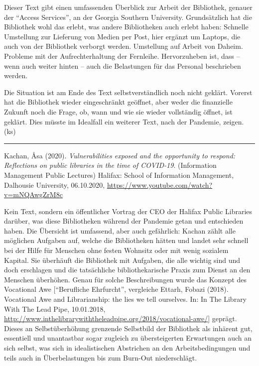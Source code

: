 \documentclass[a4paper,
fontsize=11pt,
oneside,
numbers=noperiodatend,
parskip=half-,
bibliography=totoc,
final
]{scrartcl}
\begin{document}
Dieser Text gibt einen umfassenden Überblick zur Arbeit der Bibliothek,
genauer der \enquote{Access Services}, an der Georgia Southern
University. Grundsätzlich hat die Bibliothek wohl das erlebt, was andere
Bibliotheken auch erlebt haben: Schnelle Umstellung zur Lieferung von
Medien per Post, hier ergänzt um Laptops, die auch von der Bibliothek
verborgt werden. Umstellung auf Arbeit von Daheim. Probleme mit der
Aufrechterhaltung der Fernleihe. Hervorzuheben ist, dass -- wenn auch
weiter hinten -- auch die Belastungen für das Personal beschrieben
werden.

Die Situation ist am Ende des Text selbstverständlich noch nicht
geklärt. Vorerst hat die Bibliothek wieder eingeschränkt geöffnet, aber
weder die finanzielle Zukunft noch die Frage, ob, wann und wie sie
wieder vollständig öffnet, ist geklärt. Dies müsste im Idealfall ein
weiterer Text, nach der Pandemie, zeigen. (ks)

\begin{center}\rule{0.5\linewidth}{0.5pt}\end{center}

Kachan, Åsa (2020). \emph{Vulnerabilities exposed and the opportunity to
respond: Reflections on public libraries in the time of COVID-19}.
(Information Management Public Lectures) Halifax: School of Information
Management, Dalhousie University, 06.10.2020,
\url{https://www.youtube.com/watch?v=mNQAwgZrM8c}

Kein Text, sondern ein öffentlicher Vortrag der CEO der Halifax Public
Libraries darüber, was diese Bibliotheken während der Pandemie getan und
entschieden haben. Die Übersicht ist umfassend, aber auch gefährlich:
Kachan zählt alle möglichen Aufgaben auf, welche die Bibliotheken hätten
und landet sehr schnell bei der Hilfe für Menschen ohne festen Wohnsitz
oder mit wenig sozialem Kapital. Sie überhäuft die Bibliothek mit
Aufgaben, die alle wichtig sind und doch erschlagen und die tatsächliche
bibliothekarische Praxis zum Dienst an den Menschen überhöhen. Genau für
solche Beschreibungen wurde das Konzept des Vocational Awe
{[}\enquote{Berufliche Ehrfurcht}, vergleiche Ettarh, Fobazi (2018).
Vocational Awe and Librarianship: the lies we tell ourselves. In: In The
Library With The Lead Pipe, 10.01.2018,
\url{http://www.inthelibrarywiththeleadpipe.org/2018/vocational-awe/}{]}
geprägt. Dieses an Selbstüberhöhung grenzende Selbstbild der Bibliothek
als inhärent gut, essentiell und unantastbar sogar zugleich zu
übersteigerten Erwartungen auch an sich selbst, was sich in
idealistischen Abstrichen an den Arbeitsbedingungen und teils auch in
Überbelastungen bis zum Burn-Out niederschlägt.
\end{document}
